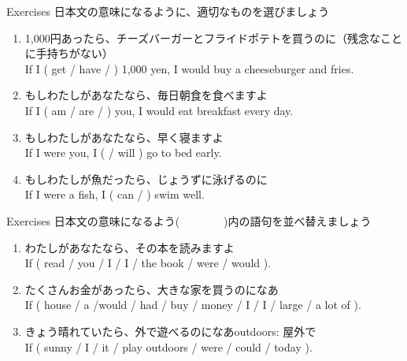 \documentclass[aspectratio=169,xcolor={dvipsnames,table}]{beamer}
\begin{document}
\begin{frame}[plain]{Exercises}
 日本文の意味になるように、適切なものを選びましょう

\begin{enumerate}
 \item 1,000円あったら、チーズバーガーとフライドポテトを買うのに（残念なことに手持ちがない）\\
If I ( get / have /  ) 1,000 yen, I would buy a cheeseburger and fries.
 \item もしわたしがあなたなら、毎日朝食を食べますよ\\
If I ( am / are /  ) you, I would eat breakfast every day. 
 \item もしわたしがあなたなら、早く寝ますよ\\
If I were you, I (  / will ) go to bed early.
\item もしわたしが魚だったら、じょうずに泳げるのに\\
If I were a fish, I ( can /   ) swim well.
\end{enumerate}
\end{frame}
\begin{frame}[plain]{Exercises}
日本文の意味になるよう(~~~~~~~~)内の語句を並べ替えましょう
 \begin{enumerate}
  \item わたしがあなたなら、その本を読みますよ\\
If ( read / you / I / I / the book / were / would  ).\\
  \item たくさんお金があったら、大きな家を買うのになあ\\
If ( house / a /would / had / buy / money / I / I / large / a lot of ).\\
  \item きょう晴れていたら、外で遊べるのになあ\hfill{\scriptsize outdoors: 屋外で}\\
If ( sunny / I / it / play outdoors / were / could / today ).\\

 \end{enumerate}
\end{frame}
\end{document}
